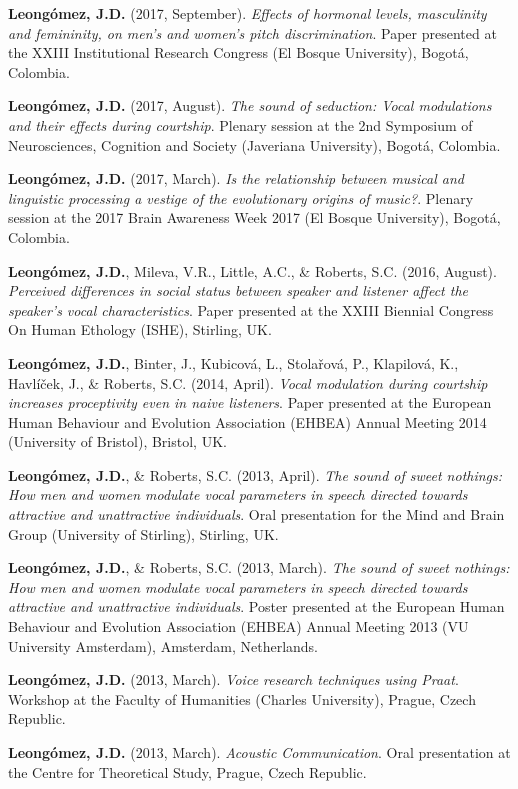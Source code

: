 \documentclass[11pt, a4paper]{awesome-cv}
\begin{document}
\textbf{Leongómez, J.D.} (2017, September). \emph{Effects of hormonal levels, masculinity and femininity, on men's and women's pitch discrimination}. Paper presented at the XXIII Institutional Research Congress (El Bosque University), Bogotá, Colombia.

\textbf{Leongómez, J.D.} (2017, August). \emph{The sound of seduction: Vocal modulations and their effects during courtship}. Plenary session at the 2nd
Symposium of Neurosciences, Cognition and Society (Javeriana University), Bogotá, Colombia.

\textbf{Leongómez, J.D.} (2017, March). \emph{Is the relationship between musical and linguistic processing a vestige of the evolutionary origins of music?}. Plenary session at the 2017 Brain Awareness Week 2017 (El Bosque University), Bogotá, Colombia.

\textbf{Leongómez, J.D.}, Mileva, V.R., Little, A.C., \& Roberts, S.C. (2016, August). \emph{Perceived differences in social status between speaker and listener affect the speaker's vocal characteristics}. Paper presented at the XXIII Biennial Congress On Human Ethology (ISHE), Stirling, UK.

\textbf{Leongómez, J.D.}, Binter, J., Kubicová, L., Stolařová, P., Klapilová, K., Havlíček, J., \& Roberts, S.C. (2014, April). \emph{Vocal modulation during courtship increases proceptivity even in naive listeners}. Paper presented at the European Human Behaviour and Evolution Association (EHBEA) Annual Meeting 2014 (University of Bristol), Bristol, UK.

\textbf{Leongómez, J.D.}, \& Roberts, S.C. (2013, April). \emph{The sound of sweet nothings: How men and women modulate vocal parameters in speech directed towards attractive and unattractive individuals}. Oral presentation for the Mind and Brain Group (University of Stirling), Stirling, UK.

\textbf{Leongómez, J.D.}, \& Roberts, S.C. (2013, March). \emph{The sound of sweet nothings: How men and women modulate vocal parameters in speech directed towards attractive and unattractive individuals}. Poster presented at the European Human Behaviour and Evolution Association (EHBEA) Annual Meeting 2013 (VU University Amsterdam), Amsterdam, Netherlands.

\textbf{Leongómez, J.D.} (2013, March). \emph{Voice research techniques using Praat}. Workshop at the Faculty of Humanities (Charles University), Prague, Czech Republic.

\textbf{Leongómez, J.D.} (2013, March). \emph{Acoustic Communication}. Oral presentation at the Centre for Theoretical Study, Prague, Czech Republic.
\end{document}
